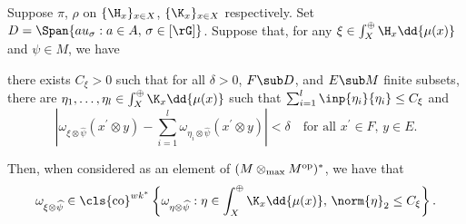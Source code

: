 \documentclass[12pt]{article}
\begin{document}
\begin{proposition}
  Suppose $ \pi$, $\rho $ on $ \{\H_{x}\}_{x\in X} $, $ \{\K_{x}\}_{x\in X} $ respectively. Set $ D = \Span\{au_{\sigma}: a\in A,\, \sigma\in [\rG]\} $. Suppose that, for any $ \xi\in \int_{X}^{\oplus}\H_{x}\dd{\mu(x)} $ and $ \psi\in M $, we have 
  \begin{center}
    there exists $ C_{\xi}>0 $ such that for all $ \delta>0  $, $ F\sub D $, and $ E\sub M $ finite subsets, \\
    there are $ \eta_{1}, \ldots, \eta_{l}\in \int_{X}^{\oplus}\K_{x}\dd{\mu(x)} $ such that $ \sum_{i=1}^{l}\inp{\eta_{i}}{\eta_{i}}\leq C_{\xi} $ and 
    \[
      \left| \omega_{\xi \otimes \widehat{\psi}}(x^{\prime} \otimes y) - \sum_{i=1}^{l} \omega_{\eta_{i} \otimes \widehat{\psi}}(x^{\prime} \otimes y)\right| < \delta\quad \text{for all }x^{\prime}\in F,\, y\in E.
    \]
  \end{center}
  Then, when considered as an element of $ (M \otimes_{\text{max}} M^{\rm{op}})^{*} $, we have that 
  \[
    \omega_{\xi \otimes \widehat{\psi}}\in \cls{\text{co}}^{wk^{*}}\left\{\omega_{\eta \otimes \widehat{\psi}}: \eta\in\int_{X}^{\oplus} \K_{x}\dd{\mu(x)},\, \norm{\eta}_{2}\leq C_{\xi}\right\}.
  \]
\end{proposition}
\end{document}
